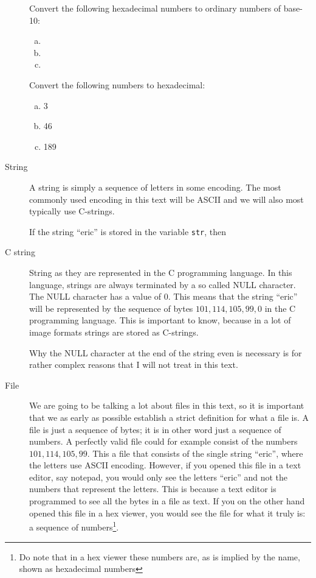 \begin{description}
  \begin{Exercise}[label={hex-to-n}]
    Convert the following hexadecimal numbers to ordinary numbers of
    base-10:

    \begin{enumerate}[(a)]
    \item {}
    \item {}
    \item {}
    \end{enumerate}

  \end{Exercise}

  \begin{Exercise}[label={n-to-hex}]
    Convert the following numbers to hexadecimal:

    \begin{enumerate}[(a)]
    \item 3
    \item 46
    \item 189
    \end{enumerate}

  \end{Exercise}


\item[String] A string is simply a sequence of letters in some
  encoding. The most commonly used encoding in this text will be
  ASCII \cite{rfc20} and we will also most typically use C-strings.

  If the string ``eric'' is stored in the variable \texttt{str}, then

\item[C string] String as they are represented in the C programming
  language. In this language, strings are always terminated by a so
  called NULL character. The NULL character has a value of
  $0$\cite{kernighan1988c}. This means that the string ``eric'' will
  be represented by the sequence of bytes $101,114,105,99, 0$ in the C
  programming language. This is important to know, because in a lot of
  image formats strings are stored as C-strings.

  Why the NULL character at the end of the string even is necessary is
  for rather complex reasons that I will not treat in this text.

\item[File] We are going to be talking a lot about files in this text,
  so it is important that we as early as possible establish a strict
  definition for what a file is. A file is just a sequence of bytes;
  it is in other word just a sequence of numbers. A perfectly valid
  file could for example consist of the numbers $101,114,105,99$. This
  a file that consists of the single string ``eric'', where the
  letters use ASCII encoding. However, if you opened this file in a
  text editor, say notepad, you would only see the letters ``eric''
  and not the numbers that represent the letters. This is because a
  text editor is programmed to see all the bytes in a file as text. If
  you on the other hand opened this file in a hex viewer, you would
  see the file for what it truly is: a sequence of numbers\footnote{Do
    note that in a hex viewer these numbers are, as is implied by the
    name, shown as hexadecimal numbers}.



\end{description}
